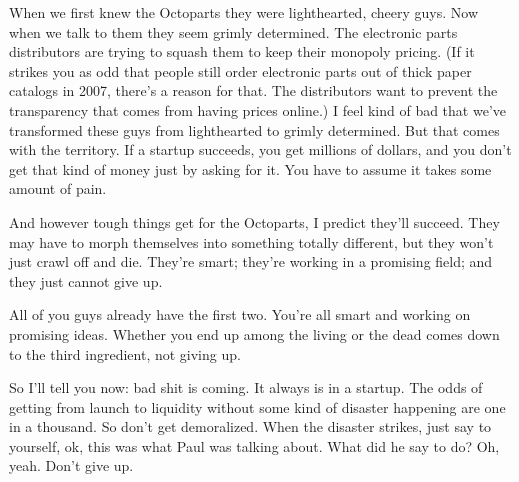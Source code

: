 When
                    we first knew the Octoparts they were lighthearted, cheery
                    guys. Now when we talk to them they seem grimly determined.
                    The electronic parts distributors are trying to squash them
                    to keep their monopoly pricing. (If it strikes you as odd
                    that people still order electronic parts out of thick paper
                    catalogs in 2007, there's a reason for that. The
                    distributors want to prevent the transparency that comes
                    from having prices online.) I feel kind of bad that we've
                    transformed these guys from lighthearted to grimly
                    determined. But that comes with the territory. If a startup
                    succeeds, you get millions of dollars, and you don't get
                    that kind of money just by asking for it. You have to assume
                    it takes some amount of pain.

And however tough
                    things get for the Octoparts, I predict they'll succeed.
                    They may have to morph themselves into something totally
                    different, but they won't just crawl off and die. They're
                    smart; they're working in a promising field; and they just
                    cannot give up.

All of you guys already have the
                    first two. You're all smart and working on promising ideas.
                    Whether you end up among the living or the dead comes down
                    to the third ingredient, not giving up.

So I'll
                    tell you now: bad shit is coming. It always is in a startup.
                    The odds of getting from launch to liquidity without some
                    kind of disaster happening are one in a thousand. So don't
                    get demoralized. When the disaster strikes, just say to
                    yourself, ok, this was what Paul was talking about. What did
                    he say to do? Oh, yeah. Don't give up.



              
            
          
